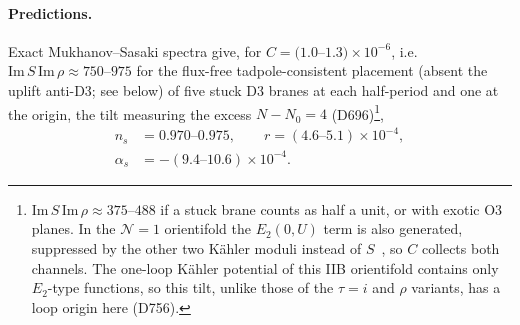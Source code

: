 \documentclass[aps,prd,twocolumn,superscriptaddress,nofootinbib,floatfix]{revtex4-2}
\begin{document}
\paragraph{Predictions.} Exact Mukhanov--Sasaki spectra give, for $C=(1.0$--$1.3)\times10^{-6}$, i.e.\ $\mathrm{Im}\,S\,\mathrm{Im}\,\rho\approx750$--$975$ for the flux-free tadpole-consistent placement (absent the uplift anti-D3; see below) of five stuck D3 branes at each half-period and one at the origin, the tilt measuring the excess $N-N_0=4$ (D696)\footnote{$\mathrm{Im}\,S\,\mathrm{Im}\,\rho\approx375$--$488$ if a stuck brane counts as half a unit, or with exotic O3 planes. In the $\mathcal N=1$ orientifold the $E_2(0,U)$ term is also generated, suppressed by the other two K\"ahler moduli instead of $S$~\cite{BHK2005}, so $C$ collects both channels. The one-loop K\"ahler potential of this IIB orientifold contains only $E_2$-type functions, so this tilt, unlike those of the $\tau=i$ and $\rho$ variants, has a loop origin here (D756).},
\begin{align}
n_s&=0.970\text{--}0.975,\qquad r=(4.6\text{--}5.1)\times10^{-4},\nonumber\\
\alpha_s&=-(9.4\text{--}10.6)\times10^{-4}.
\end{align}
\end{document}
